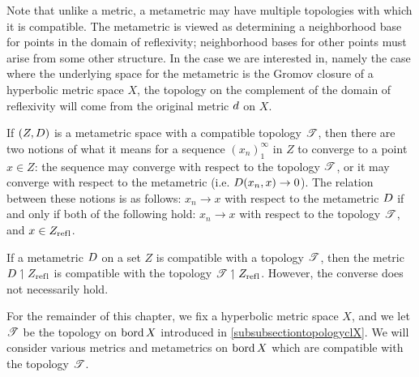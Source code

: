 Note that unlike a metric, a metametric may have multiple topologies with which it is compatible. The metametric is viewed as determining a neighborhood base for points in the domain of reflexivity; neighborhood bases for other points must arise from some other structure. In the case we are interested in, namely the case where the underlying space for the metametric is the Gromov closure of a hyperbolic metric space $X$, the topology on the complement of the domain of reflexivity will come from the original metric $d$ on $X$.

\begin{remark}
\label{remarktopologymetametrics}
If $(Z,D)$ is a metametric space with a compatible topology $\mathscr T$, then there are two notions of what it means for a sequence $(x_n)_1^\infty$ in $Z$ to converge to a point $x\in Z$: the sequence may converge with respect to the topology $\mathscr T$, or it may converge with respect to the metametric (i.e. $D(x_n,x)\to 0$). The relation between these notions is as follows: $x_n\to x$ with respect to the metametric $D$ if and only if both of the following hold: $x_n\to x$ with respect to the topology $\mathscr T$, and $x\in Z_{\mathrm{ref \hspace{0 in} l}}$.
\end{remark}

\begin{remark}
If a metametric $D$ on a set $Z$ is compatible with a topology $\mathscr T$, then the metric $D\upharpoonleft Z_{\mathrm{ref \hspace{0 in} l}}$ is compatible with the topology $\mathscr T\upharpoonleft Z_{\mathrm{ref \hspace{0 in} l}}$. However, the converse does not necessarily hold.
\end{remark}


For the remainder of this chapter, we fix a hyperbolic metric space $X$, and we let $\mathscr T$ be the topology on $\operatorname{bord} X$ introduced in \6\ref{subsubsectiontopologyclX}. We will consider various metrics and metametrics on $\operatorname{bord} X$ which are compatible with the topology $\mathscr T$.

